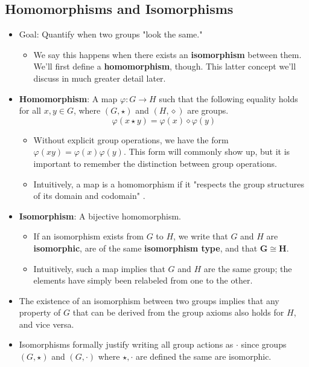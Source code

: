 \documentclass[../notes.tex]{subfiles}
\begin{document}
\subsection*{Homomorphisms and Isomorphisms}
\begin{itemize}
    \item Goal: Quantify when two groups "look the same."
    \begin{itemize}
        \item We say this happens when there exists an \textbf{isomorphism} between them. We'll first define a \textbf{homomorphism}, though. This latter concept we'll discuss in much greater detail later.
    \end{itemize}
    \item \textbf{Homomorphism}: A map $\varphi:G\to H$ such that the following equality holds for all $x,y\in G$, where $(G,\star)$ and $(H,\diamond)$ are groups.
    \begin{equation*}
        \varphi(x\star y) = \varphi(x)\diamond\varphi(y)
    \end{equation*}
    \begin{itemize}
        \item Without explicit group operations, we have the form $\varphi(xy)=\varphi(x)\varphi(y)$. This form will commonly show up, but it is important to remember the distinction between group operations.
        \item Intuitively, a map is a homomorphism if it "respects the group structures of its domain and codomain" \parencite[37]{bib:DummitFoote}.
    \end{itemize}
    \item \textbf{Isomorphism}: A bijective homomorphism.
    \begin{itemize}
        \item If an isomorphism exists from $G$ to $H$, we write that $G$ and $H$ are \textbf{isomorphic}, are of the same \textbf{isomorphism type}, and that $\bm{G\cong H}$.
        \item Intuitively, such a map implies that $G$ and $H$ are the same group; the elements have simply been relabeled from one to the other.
    \end{itemize}
    \item The existence of an isomorphism between two groups implies that any property of $G$ that can be derived from the group axioms also holds for $H$, and vice versa.
    \item Isomorphisms formally justify writing all group actions as $\cdot$ since groups $(G,\star)$ and $(G,\cdot)$ where $\star,\cdot$ are defined the same are isomorphic.

\end{itemize}
\end{document}
